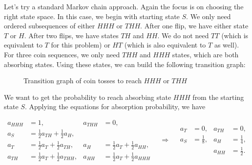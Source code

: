 
\begin{solution}
Let's try a standard Markov chain approach. Again the focus is on choosing the right state space. In
this case, we begin with starting state $S$. We only need ordered subsequences of either $HHH$ or
$THH$. After one flip, we have either state $T$ or $H$. After two flips, we have states $TH$ and $HH$.
We do not need $TT$ (which is equivalent to $T$ for this problem) or $HT$ (which is also equivalent to
$T$ as well). For three coin sequences, we only need $THH$ and $HHH$ states, which are both absorbing
states. Using these states, we can build the following transition graph:

\begin{figure}[ht]
\centering
{}
\caption{Transition graph of coin tosses to reach $HHH$ or $THH$}
\end{figure}

We want to get the probability to reach absorbing state $HHH$ from the starting state $S$. Applying
the equations for absorption probability, we have

\[
\begin{aligned}
a_{HHH}&=1, & a_{THH}&=0,\\
a_S&=\tfrac{1}{2}a_{TH}+\tfrac{1}{2}a_H,\\
a_T&=\tfrac{1}{2}a_T+\tfrac{1}{2}a_{TH}, & a_H&=\tfrac{1}{2}a_T+\tfrac{1}{2}a_{HH},\\
a_{TH}&=\tfrac{1}{2}a_T+\tfrac{1}{2}a_{THH}, & a_{HH}&=\tfrac{1}{2}a_T+\tfrac{1}{2}a_{HHH}
\end{aligned}
\quad\Rightarrow\quad
\begin{aligned}
a_T&=0, & a_{TH}&=0,\\
a_S&=\tfrac{1}{8}, & a_H&=\tfrac{1}{4},\\
&& a_{HH}&=\tfrac{1}{2}.
\end{aligned}
\]


\end{solution}
